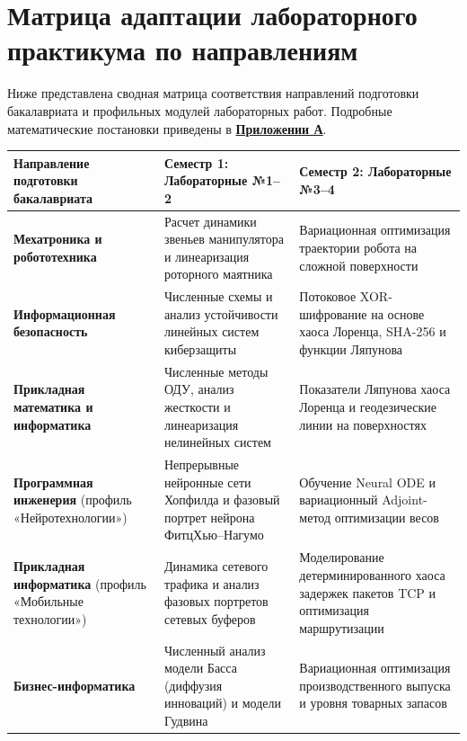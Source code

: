 \documentclass[12pt]{article}
\begin{document}
\section*{Матрица адаптации лабораторного практикума по направлениям}\label{sec:matrix}

\begin{greenblock}
Ниже представлена сводная матрица соответствия направлений подготовки бакалавриата и профильных модулей лабораторных работ. Подробные математические постановки приведены в \hyperref[app:A]{\textbf{Приложении А}}.
\end{greenblock}

\vspace{0.3em}
\begin{center}
\small
\begin{tabularx}{\textwidth}{|p{4.5cm}|X|X|}
\hline
\textbf{Направление подготовки бакалавриата} & \textbf{Семестр 1: Лабораторные №1--2} & \textbf{Семестр 2: Лабораторные №3--4} \\
\hline
\textbf{Мехатроника и робототехника} & Расчет динамики звеньев манипулятора и линеаризация роторного маятника & Вариационная оптимизация траектории робота на сложной поверхности \\
\hline
\textbf{Информационная безопасность} & Численные схемы и анализ устойчивости линейных систем киберзащиты & Потоковое XOR-шифрование на основе хаоса Лоренца, SHA-256 и функции Ляпунова \\
\hline
\textbf{Прикладная математика и информатика} & Численные методы ОДУ, анализ жесткости и линеаризация нелинейных систем & Показатели Ляпунова хаоса Лоренца и геодезические линии на поверхностях \\
\hline
\textbf{Программная инженерия} (профиль «Нейротехнологии») & Непрерывные нейронные сети Хопфилда и фазовый портрет нейрона ФитцХью--Нагумо & Обучение Neural ODE и вариационный Adjoint-метод оптимизации весов \\
\hline
\textbf{Прикладная информатика} (профиль «Мобильные технологии») & Динамика сетевого трафика и анализ фазовых портретов сетевых буферов & Моделирование детерминированного хаоса задержек пакетов TCP и оптимизация маршрутизации \\
\hline
\textbf{Бизнес-информатика} & Численный анализ модели Басса (диффузия инноваций) и модели Гудвина & Вариационная оптимизация производственного выпуска и уровня товарных запасов \\
\hline
\end{tabularx}
\end{center}
\end{document}
